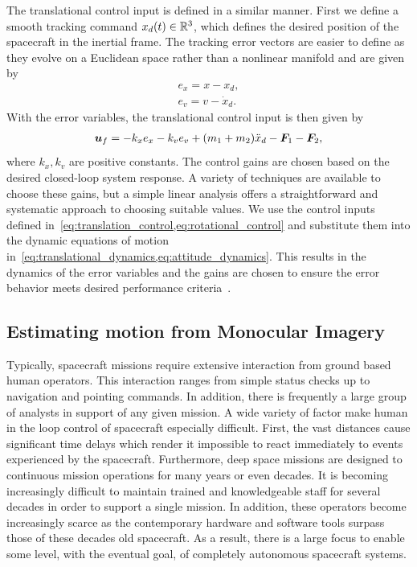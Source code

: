 \documentclass[letterpaper, paper,11pt]{AAS}		%
\begin{document}
The translational control input is defined in a similar manner. 
First we define a smooth tracking command \( x_d(t) \in \mathbb{R}^3 \), which defines the desired position of the spacecraft in the inertial frame.
The tracking error vectors are easier to define as they evolve on a Euclidean space rather than a nonlinear manifold and are given by
\begin{align}
    e_x = x - x_d ,\\
    e_v = v - \dot{x}_d .
\end{align}
With the error variables, the translational control input is then given by
\begin{align}\label{eq:translation_control}
    \bm{u}_f = - k_x e_x  - k_v e_v + ( m_1  + m_2 ) \ddot{x}_d - \bm{F}_1 - \bm{F}_2 ,
\end{align}
where \( k_x, k_v \) are positive constants. 
The control gains are chosen based on the desired closed-loop system response. 
A variety of techniques are available to choose these gains, but a simple linear analysis offers a straightforward and systematic approach to choosing suitable values. 
We use the control inputs defined in~\cref{eq:translation_control,eq:rotational_control} and substitute them into the dynamic equations of motion in~\cref{eq:translational_dynamics,eq:attitude_dynamics}.
This results in the dynamics of the error variables and the gains are chosen to ensure the error behavior meets desired performance criteria~\cite{nise2004}.


\subsection{Estimating motion from Monocular Imagery}\label{eq:image_processing}

Typically, spacecraft missions require extensive interaction from ground based human operators. 
This interaction ranges from simple status checks up to navigation and pointing commands.
In addition, there is frequently a large group of analysts in support of any given mission. 
A wide variety of factor make human in the loop control of spacecraft especially difficult.
First, the vast distances cause significant time delays which render it impossible to react immediately to events experienced by the spacecraft. 
Furthermore, deep space missions are designed to continuous mission operations for many years or even decades. 
It is becoming increasingly difficult to maintain trained and knowledgeable staff for several decades in order to support a single mission.
In addition, these operators become increasingly scarce as the contemporary hardware and software tools surpass those of these decades old spacecraft. 
As a result, there is a large focus to enable some level, with the eventual goal, of completely autonomous spacecraft systems.
\end{document}
